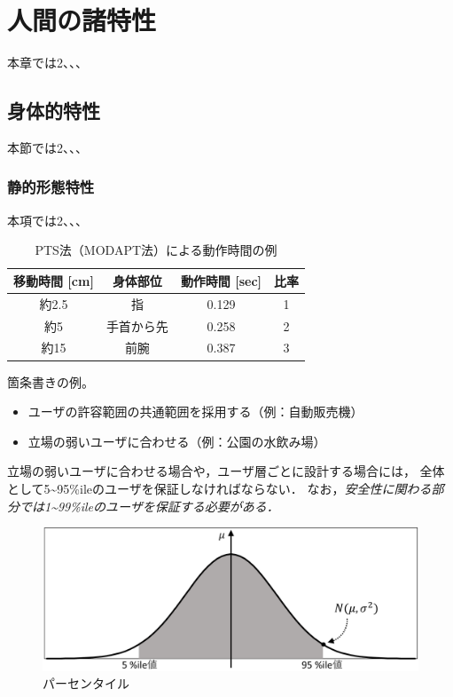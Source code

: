 \section{人間の諸特性}
本章では2、、、

\subsection{身体的特性}
本節では2、、、

\subsubsection{静的形態特性}
本項では2、、、

\begin{table}[h]
\centering
\caption{PTS法（MODAPT法）による動作時間の例}
\label{MODAPT}
\begin{tabular}{cccc}
\toprule
移動時間 [cm] & 身体部位 & 動作時間 [sec] & 比率 \\
\midrule
約2.5 & 指 & 0.129 & 1 \\
約5 & 手首から先 & 0.258 & 2 \\
約15 & 前腕 & 0.387 & 3 \\
\bottomrule
\end{tabular}
\end{table}

箇条書きの例。
\begin{itemize}
\item ユーザの許容範囲の共通範囲を採用する（例：自動販売機）
\item 立場の弱いユーザに合わせる（例：公園の水飲み場）
\end{itemize}

立場の弱いユーザに合わせる場合や，ユーザ層ごとに設計する場合には，
全体として5\textasciitilde95\%ileのユーザを保証しなければならない．
なお，\emph{安全性に関わる部分では1\textasciitilde99\%ileのユーザを保証する必要がある．}

\begin{figure}[h]
\centering
\includegraphics[width=13cm]{img/fig.png}
\caption{パーセンタイル}
\end{figure}

